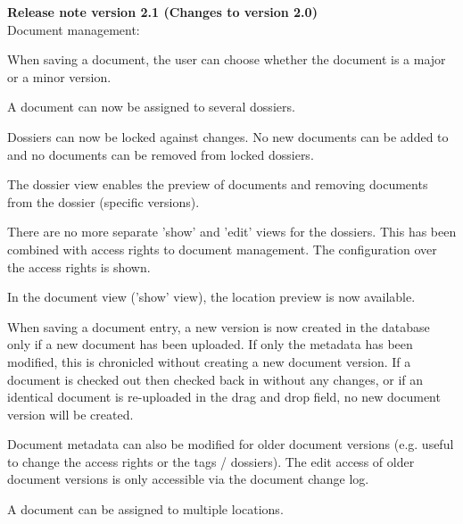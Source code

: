 \vspace{\baselineskip}

\textbf{Release note version 2.1 (Changes to version 2.0)} \\

Document management:

\begin{compactitem}
	\item When saving a document, the user can choose whether the document is a major or a minor version.
	\item A document can now be assigned to several dossiers.
	\item Dossiers can now be locked against changes. No new documents can be added to and no documents can be removed from locked dossiers.
	\item The dossier view enables the preview of documents and removing documents from the dossier (specific versions).
	\item There are no more separate 'show' and 'edit' views for the dossiers. This has been combined with access rights to document management. The configuration over the access rights is shown.
	\item In the document view ('show' view), the location preview is now available.
	\item When saving a document entry, a new version is now created in the database only if a new document has been uploaded. If only the metadata has been modified, this is chronicled without creating a new document version. If a document is checked out then checked back in without any changes, or if an identical document is re-uploaded in the drag and drop field, no new document version will be created.
	\item Document metadata can also be modified for older document versions (e.g. useful to change the access rights or the tags / dossiers). The edit access of older document versions is only accessible via the document change log.
	\item A document can be assigned to multiple locations. 
\end{compactitem}

